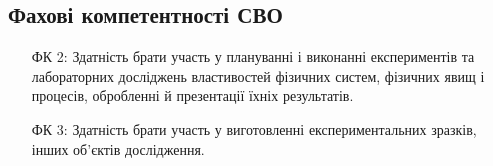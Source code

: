 \documentclass{Syllabus}
\begin{document}
\subsection*{Фахові компетентності СВО}

\begin{enumerate}
\item [ФК 2:] Здатність брати участь у плануванні і виконанні експериментів та лабораторних досліджень властивостей фізичних систем, фізичних явищ і процесів, обробленні й презентації їхніх результатів.
\item [ФК 3:] Здатність брати участь у виготовленні експериментальних зразків, інших об'єктів дослідження.
\end{enumerate}
\end{document}
